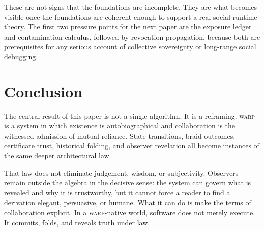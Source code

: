 \documentclass[11pt]{article}
\theoremstyle{definition}
\theoremstyle{plain}
\theoremstyle{remark}
\newcommand{\WARP}{\textsc{warp}}
\begin{document}
These are not signs that the foundations are incomplete. They are what becomes visible once the foundations are coherent enough to support a real social-runtime theory. The first two pressure points for the next paper are the exposure ledger and contamination calculus, followed by revocation propagation, because both are prerequisites for any serious account of collective sovereignty or long-range social debugging.

\section{Conclusion}

The central result of this paper is not a single algorithm. It is a reframing. \WARP{} is a system in which existence is autobiographical and collaboration is the witnessed admission of mutual reliance. State transitions, braid outcomes, certificate trust, historical folding, and observer revelation all become instances of the same deeper architectural law.

That law does not eliminate judgement, wisdom, or subjectivity. Observers remain outside the algebra in the decisive sense: the system can govern what is revealed and why it is trustworthy, but it cannot force a reader to find a derivation elegant, persuasive, or humane. What it can do is make the terms of collaboration explicit. In a \WARP{}-native world, software does not merely execute. It commits, folds, and reveals truth under law.
\end{document}
